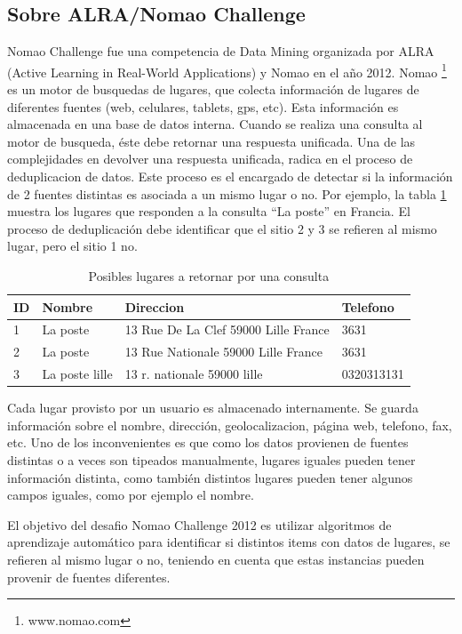 \documentclass[journal]{IEEEtran}
\begin{document}
\subsection{Sobre ALRA/Nomao Challenge}
Nomao Challenge fue una competencia de Data Mining organizada por ALRA 
(Active Learning in Real-World Applications) y Nomao en el año 2012. Nomao 
\footnote{www.nomao.com} es un motor de busquedas de lugares, que colecta
información de lugares de diferentes fuentes (web, celulares, tablets, gps, 
etc). Esta información es almacenada en una base de datos interna. 
Cuando se realiza una consulta al motor de busqueda, éste debe retornar una
respuesta unificada. Una de las complejidades en devolver una
respuesta unificada, radica en el proceso de deduplicacion de datos. Este
proceso es el encargado de detectar si la información de 2 fuentes distintas
es asociada a un mismo lugar o no. Por ejemplo, la tabla \ref{table:example1}
muestra los lugares que responden a la consulta ``La poste'' en Francia. El
proceso de deduplicación debe identificar que el sitio 2 y 3 se refieren
al mismo lugar, pero el sitio 1 no.

\begin{table}[ht!]
\caption{Posibles lugares a retornar por una consulta}
\label{table:example1}
\centering
\begin{tabular}{l | l l l }
ID & Nombre & Direccion & Telefono  \\
\hline
1 & La poste & 13 Rue De La Clef 59000 Lille France & 3631 \\ 
2 & La poste & 13 Rue Nationale 59000 Lille France & 3631 \\
3 & La poste lille & 13 r. nationale 59000 lille & 0320313131 \\
\end{tabular}
\end{table}

Cada lugar provisto por un usuario es almacenado internamente. Se guarda
información sobre el nombre, dirección, geolocalizacion, página web,
telefono, fax, etc. Uno de los inconvenientes es que como los datos
provienen de fuentes distintas o a veces son tipeados manualmente,
lugares iguales pueden tener información distinta, como también
distintos lugares pueden tener algunos campos iguales, como por 
ejemplo el nombre.

El objetivo del desafio Nomao Challenge 2012 es utilizar 
algoritmos de aprendizaje automático para identificar si 
distintos items con datos de lugares, se refieren al mismo
lugar o no, teniendo en cuenta que estas instancias
pueden provenir de fuentes diferentes.
\end{document}
